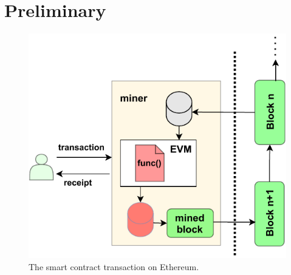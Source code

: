 \chapter{Preliminary}
\label{ch:preliminary}
\begin{figure}[t]
	\centering
	\includegraphics[scale=0.7]{Figures/Chapter5/SmartContractTransaction.pdf}
	\caption{The smart contract transaction on Ethereum.}
	\label{fig:smartcontractTransaction}
\end{figure}

